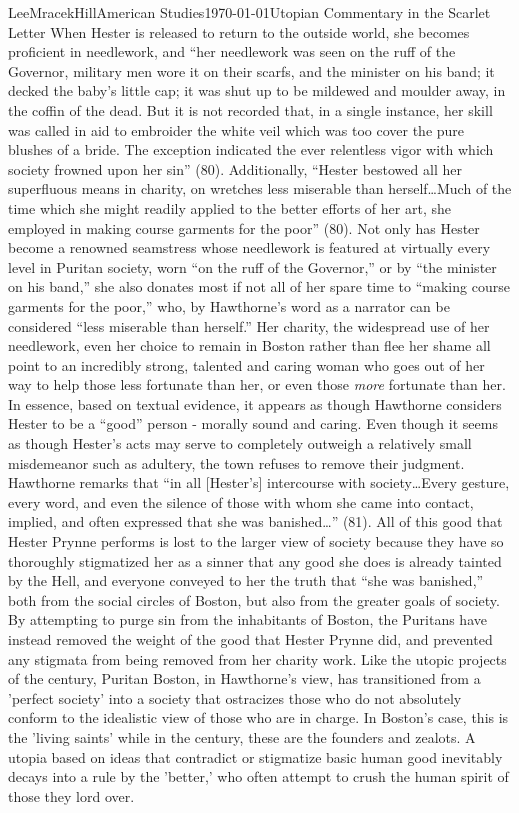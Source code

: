 \documentclass[12pt, letterpaper]{article}
\begin{document}
\begin{mla}{Lee}{Mracek}{Hill}{American Studies}{\today}{Utopian Commentary in the Scarlet Letter}
When Hester is released to return to the outside world, she becomes proficient in needlework, and ``her needlework was seen on the ruff of the Governor, military men wore it on their scarfs, and the minister on his band; it decked the baby's little cap; it was shut up to be mildewed and moulder away, in the coffin of the dead. But it is not recorded that, in a single instance, her skill was called in aid to embroider the white veil which was too cover the pure blushes of a bride. The exception indicated the ever relentless vigor with which society frowned upon her sin'' (80). Additionally, ``Hester bestowed all her superfluous means in charity, on wretches less miserable than herself\ldots Much of the time which she might readily applied to the better efforts of her art, she employed in making course garments for the poor'' (80). Not only has Hester become a renowned seamstress whose needlework is featured at virtually every level in Puritan society, worn ``on the ruff of the Governor,'' or by ``the minister on his band,'' she also donates most if not all of her spare time to ``making course garments for the poor,'' who, by Hawthorne's word as a narrator can be considered ``less miserable than herself.'' Her charity, the widespread use of her needlework, even her choice to remain in Boston rather than flee her shame all point to an incredibly strong, talented and caring woman who goes out of her way to help those less fortunate than her, or even those \textit{more} fortunate than her. In essence, based on textual evidence, it appears as though Hawthorne considers Hester to be a ``good'' person - morally sound and caring. Even though it seems as though Hester's acts may serve to completely outweigh a relatively small misdemeanor such as adultery, the town refuses to remove their judgment. Hawthorne remarks that ``in all [Hester's] intercourse with society\ldots Every gesture, every word, and even the silence of those with whom she came into contact, implied, and often expressed that she was banished\ldots'' (81). All of this good that Hester Prynne performs is lost to the larger view of society because they have so thoroughly stigmatized her as a sinner that any good she does is already tainted by the Hell, and everyone conveyed to her the truth that ``she was banished,'' both from the social circles of Boston, but also from the greater goals of society. By attempting to purge sin from the inhabitants of Boston, the Puritans have instead removed the weight of the good that Hester Prynne did, and prevented any stigmata from being removed from her charity work. Like the utopic projects of the  century, Puritan Boston, in Hawthorne's view, has transitioned from a 'perfect society' into a society that ostracizes those who do not absolutely conform to the idealistic view of those who are in charge. In Boston's case, this is the 'living saints' while in the  century, these are the founders and zealots. A utopia based on ideas that contradict or stigmatize basic human good inevitably decays into a rule by the 'better,' who often attempt to crush the human spirit of those they lord over.\\

\end{mla}
\end{document}
